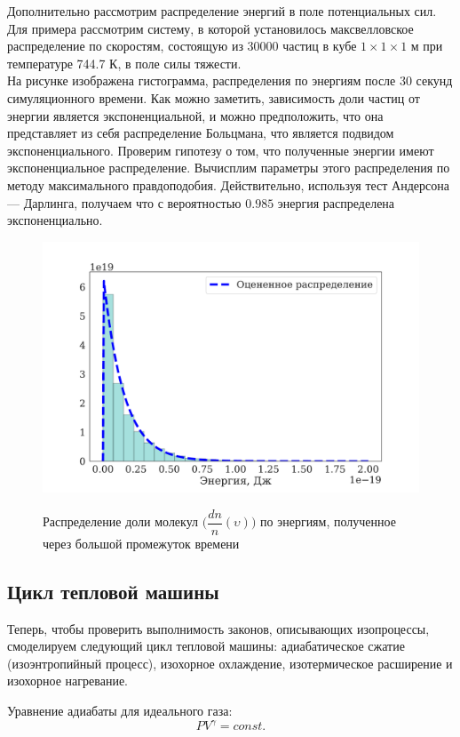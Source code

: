 \documentclass[twoside,twocolumn, 11pt]{article}
\theoremstyle{plain}
\theoremstyle{definition}
\begin{document}
Дополнительно рассмотрим распределение энергий в поле потенциальных сил. Для примера рассмотрим систему, в которой установилось максвелловское распределение по скоростям, состоящую из 30000 частиц в кубе $1 \times 1 \times 1$ м при температуре 744.7 К, в поле силы тяжести.\\
\indent На рисунке изображена гистограмма, распределения по энергиям после 30 секунд симуляционного времени. Как можно заметить, зависимость доли частиц от энергии является экспоненциальной, и можно предположить, что она представляет из себя распределение Больцмана, что
является подвидом экспоненциального. Проверим гипотезу о том, что полученные энергии имеют экспоненциальное распределение. Вычисплим параметры этого распределения
по методу максимального правдоподобия. Действительно, используя тест Андерсона — Дарлинга, получаем что с вероятностью $0.985$ энергия распределена экспоненциально.

\begin{figure}[!h]
{\includegraphics[width=1\linewidth]{hist_E}}
\caption{Распределение доли молекул $\Big(\dfrac{dn}{n} (\upsilon) \Big)$ по энергиям, полученное через большой промежуток времени}
\end{figure}

\subsection{Цикл тепловой машины}
Теперь, чтобы проверить выполнимость законов, описывающих изопроцессы, смоделируем следующий цикл тепловой машины:
адиабатическое сжатие (изоэнтропийный процесс), изохорное охлаждение, изотермическое расширение и изохорное нагревание.

Уравнение адиабаты для идеального газа:
\[PV^\gamma = const. \]
\end{document}

